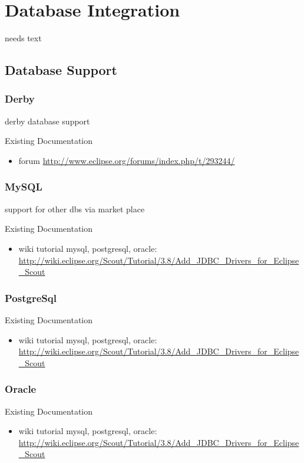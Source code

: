 \documentclass[a4paper,10pt,twoside]{book}
\begin{document}
\chapter{Database Integration}
needs text

\section{Database Support}

\subsection{Derby}
derby database support

\noindent Existing Documentation
\begin{itemize}
  \item forum \url{http://www.eclipse.org/forums/index.php/t/293244/}
\end{itemize}

\subsection{MySQL}
support for other dbs via market place

\noindent Existing Documentation
\begin{itemize}
  \item wiki tutorial mysql, postgresql, oracle: \url{http://wiki.eclipse.org/Scout/Tutorial/3.8/Add_JDBC_Drivers_for_Eclipse_Scout}
\end{itemize}

\subsection{PostgreSql}

\noindent Existing Documentation
\begin{itemize}
  \item wiki tutorial mysql, postgresql, oracle: \url{http://wiki.eclipse.org/Scout/Tutorial/3.8/Add_JDBC_Drivers_for_Eclipse_Scout}
\end{itemize}

\subsection{Oracle}

\noindent Existing Documentation
\begin{itemize}
  \item wiki tutorial mysql, postgresql, oracle: \url{http://wiki.eclipse.org/Scout/Tutorial/3.8/Add_JDBC_Drivers_for_Eclipse_Scout}
\end{itemize}
\end{document}
